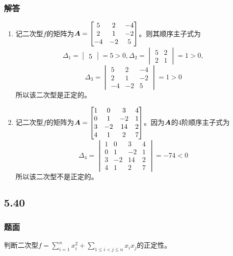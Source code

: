 \documentclass[9pt,xcolor=svgnames]{beamer} %
\begin{document}
\begin{frame}[allowframebreaks]
    \frametitle{解答}
    \begin{enumerate}
        \item {
              记二次型\(f\)的矩阵为\(\boldsymbol{A}=\begin{bmatrix}5&2&-4\\2&1&-2\\-4&-2&5\end{bmatrix}\)。则其顺序主子式为
              \begin{equation*}
                  \Delta_1=\begin{vmatrix}5\end{vmatrix}=5>0,\Delta_2=\begin{vmatrix}5&2\\2&1\end{vmatrix}=1>0,
              \end{equation*}
              \begin{equation*}
                  \Delta_3=\begin{vmatrix}5&2&-4\\2&1&-2\\-4&-2&5\end{vmatrix}=1>0
              \end{equation*}
              所以该二次型是正定的。
              }
        \item {
              记二次型\(f\)的矩阵为\(\boldsymbol{A}=\begin{bmatrix}1&0&3&4\\0&1&-2&1\\3&-2&14&2\\4&1&2&7\end{bmatrix}\)。因为\(\boldsymbol{A}\)的\(4\)阶顺序主子式为
              \begin{equation*}
                  \Delta_4=\begin{vmatrix}1&0&3&4\\0&1&-2&1\\3&-2&14&2\\4&1&2&7\end{vmatrix}=-74<0
              \end{equation*}
              所以该二次型不是正定的。
              }
    \end{enumerate}
\end{frame}

\subsection*{5.40}
\begin{frame}
    \frametitle{题面}
    判断二次型\(f=\sum_{i=1}^nx_i^2+\sum_{1\le i<j\le n}x_ix_j\)的正定性。
\end{frame}
\end{document}
